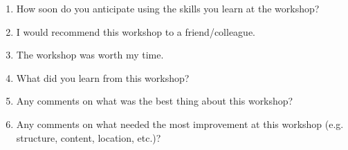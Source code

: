 \documentclass[12pt]{article}
\begin{document}
\begin{enumerate}
    \item How soon do you anticipate using the skills you learn at the workshop?
    
    \item I would recommend this workshop to a friend/colleague.
    
    \item The workshop was worth my time.
    
    \item What did you learn from this workshop?

    \item Any comments on what was the best thing about this workshop?

    \item Any comments on what needed the most improvement at this workshop (e.g. structure,
content, location, etc.)?

\end{enumerate}
\end{document}
